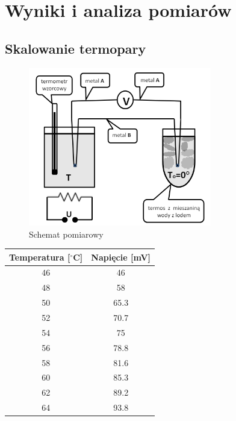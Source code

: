 {\section{Wyniki i analiza pomiarów}}

{\subsection{Skalowanie termopary}}

\begin{figure}[!h]
    \centering
    \includegraphics[width=8cm]{imgs/schemat_pom.png}
    \caption{Schemat pomiarowy}
    \label{fig:enter-label}
\end{figure}

\begin{center}
    \begin{tabular}{|c|c|}
        \hline
        Temperatura {[}$^{\circ}$C{]} & Napięcie {[}mV{]} \\ \hline \hline
        46                 & 46                \\ \hline
        48                 & 58                \\ \hline
        50                 & 65.3              \\ \hline
        52                 & 70.7              \\ \hline
        54                 & 75                \\ \hline
        56                 & 78.8              \\ \hline
        58                 & 81.6              \\ \hline
        60                 & 85.3              \\ \hline
        62                 & 89.2              \\ \hline
        64                 & 93.8              \\ \hline
    \end{tabular}
\end{center}

